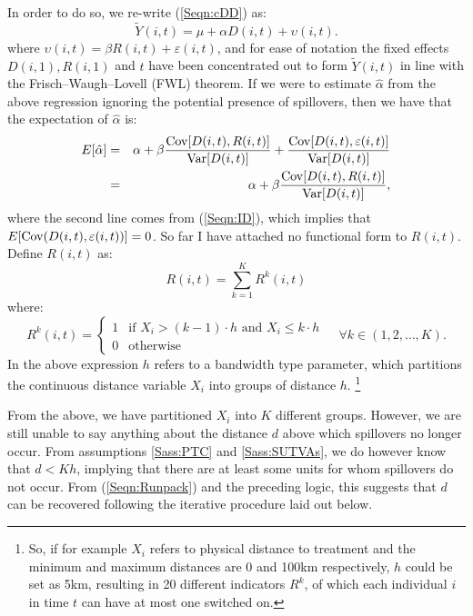 In order to do so, we re-write (\ref{Seqn:cDD}) as:
\begin{equation}
\label{Seqn:cDDconc}
\tilde{Y}(i,t)=\mu + \alpha D(i,t) + \upsilon(i,t).
\end{equation}
where $\upsilon(i,t)=\beta R(i,t)+\varepsilon(i,t)$, and for ease of notation
the fixed effects $D(i,1), R(i,1)$ and $t$ have been concentrated out to form
$\tilde{Y}(i,t)$ in line with the  Frisch--Waugh--Lovell (FWL) theorem.  If we 
were to estimate $\hat\alpha$ from the above regression ignoring the potential 
presence of spillovers, then we have that the expectation of $\hat\alpha$ is:
\begin{eqnarray}
\label{Seqn:alphaExp}
E[\hat\alpha] &=& \alpha + \beta\frac{\mathrm{Cov}[D(i,t),R(i,t)]}{\mathrm{Var}[D(i,t)]}+\frac{\mathrm{Cov}[D(i,t),\varepsilon(i,t)]}{\mathrm{Var}[D(i,t)]} \nonumber \\ 
              &=& \alpha + \beta\frac{\mathrm{Cov}[D(i,t),R(i,t)]}{\mathrm{Var}[D(i,t)]},
\end{eqnarray}
where the second line comes from (\ref{Seqn:ID}), which implies that 
$E[\mathrm{Cov}(D(i,t),\varepsilon(i,t))]=0$.  So far I have attached no functional form 
to $R(i,t)$.  Define $R(i,t)$ as:
\begin{equation}
\label{Seqn:Runpack}
R(i,t) = \sum_{k=1}^K R^k(i,t)
\end{equation}  
where:
\begin{equation}
\label{Seqn:Rpar}
 R^k(i,t) =
  \begin{cases}
   1   & \text{if\ \ } X_i>(k-1)\cdot h \text{\ \ and \ } X_i\leq k\cdot h \\
   0   & \text{otherwise} 
  \end{cases}\ \ \ \ \ \forall k \in (1,2,\ldots,K).
\end{equation}
In the above expression $h$ refers to a bandwidth type parameter, which 
partitions the continuous distance variable $X_i$ into groups of distance $h$.%
\footnote{So, if for example $X_i$ refers to physical distance to treatment and 
the minimum and maximum distances are 0 and 100km respectively, $h$ could be set 
as 5km, resulting in 20 different indicators $R^k$, of which each individual $i$ 
in time $t$ can have at most one switched on.}

From the above, we have partitioned $X_i$ into $K$ different groups. However, we
are still unable to say anything about the distance $d$ above which spillovers no 
longer occur. From assumptions \ref{Sass:PTC} and \ref{Sass:SUTVAs}, we do 
however know that $d<Kh$, implying that there are at least some units for whom 
spillovers do not occur.  From (\ref{Seqn:Runpack}) and the preceding logic, this 
suggests that $d$ can be recovered following the iterative procedure laid out 
below.

